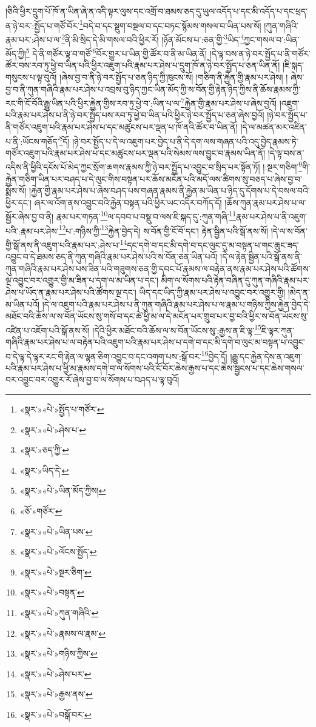 །ཅིའི་ཕྱིར་དྲུག་པོ་ཁོ་ན་ཡིན་ཞེ་ན་འདི་ལྟར་ལུས་དང་འགྲོ་བ་ཐམས་ཅད་དུ་ཡུལ་འདོད་པ་དང་མི་འདོད་པ་དང་ཕྲད་ན་ཉེ་བར་:སྤྱོད་པ་གཙོ་བོར་\footnote{«སྣར་»«པེ་»སྤྱོད་པ་གཙོར་}བདེ་བ་དང་སྡུག་བསྔལ་བ་དང་བཏང་སྙོམས་གསལ་བ་ཡིན་པས་སོ། །ཀུན་གཞིའི་རྣམ་པར་:ཤེས་པ་ལ་\footnote{«སྣར་»«པེ་»ཤེས་པ་}ནི་མི་སྲིད་དེ་མི་གསལ་བའི་ཕྱིར་རོ། །ཉོན་མོངས་པ་:ཅན་གྱི་\footnote{«སྣར་»ཅད་ཀྱི་}ཡིད་\footnote{«སྣར་»ཡིད་དེ་}ཀྱང་གསལ་བ་:ཡིན་མོད་ཀྱི།\footnote{«སྣར་»«པེ་»ཡིན་མོད་ཀྱིས།} དེ་ནི་གཙོར་ལྟ་བ་གཙོ་\footnote{«ཅོ་»གཙོར་}བོར་གྱུར་པ་ཡིན་གྱི་ཚོར་བ་ནི་མ་ཡིན་ནོ། །དེ་ལྟ་བས་ན་ཉེ་བར་སྤྱོད་པ་ནི་གཙོར་ཚོར་བས་རབ་ཏུ་ཕྱེ་བ་ཡིན་པའི་ཕྱིར་འཇུག་པའི་རྣམ་པར་ཤེས་པ་དྲུག་ཁོ་ན་ཉེ་བར་སྤྱོད་པ་ཅན་ཡིན་ནོ། །ཇི་སྐད་གསུངས་པ་ལྟ་བུའོ། །ཞེས་བྱ་བ་ནི་ཉེ་བར་སྤྱོད་པ་ཅན་ཉིད་ཀྱི་ཁུངས་སོ། །གཅིག་ནི་རྐྱེན་གྱི་རྣམ་པར་ཤེས། །
ཞེས་བྱ་བ་ནི་ཀུན་གཞིའི་རྣམ་པར་ཤེས་པ་འབྲས་བུ་ཉིད་ཀྱང་ཡིན་མོད་ཀྱི་ས་བོན་གྱི་རྟེན་ཉིད་ཀྱིས་ནི་ཆོས་རྣམས་ཀྱི་རང་གི་ངོ་བོའི་རྒྱུ་ཡིན་པའི་ཕྱིར་རྐྱེན་གྱིས་རབ་ཏུ་ཕྱེ་བ་:ཡིན་པ་ལ་\footnote{«སྣར་»«པེ་»ཡིན་པས་}རྐྱེན་གྱི་རྣམ་པར་ཤེས་པ་ཞེས་བྱའོ། །འཇུག་པའི་རྣམ་པར་ཤེས་པ་ནི་ཉེ་བར་སྤྱོད་པས་རབ་ཏུ་ཕྱེ་བ་ཡིན་པའི་ཕྱིར་ཉེ་བར་སྤྱོད་པ་ཅན་ཞེས་བྱའོ། །ཉེ་བར་སྤྱོད་པ་ནི་གཙོར་འཇུག་པའི་རྣམ་པར་ཤེས་པ་དང་མཚུངས་པར་ལྡན་པ་ཁོ་ནའི་ཚོར་བ་ཡིན་ནོ། །དེ་ལ་མཚན་མར་འཛིན་པ་ནི་:ཡོངས་གཅོད་\footnote{«སྣར་»«པེ་»ལོངས་སྤྱོད་}དོ། །ཉེ་བར་སྤྱོད་པ་དེ་ལ་འཇུག་པར་བྱེད་པ་ནི་དེ་དག་ལས་གཞན་པའི་འདུ་བྱེད་རྣམས་ཏེ་གཙོར་འཇུག་པའི་རྣམ་པར་ཤེས་པ་དང་མཚུངས་པར་ལྡན་པའི་སེམས་ལས་བྱུང་བ་རྣམས་ཡིན་ནོ། །དེ་ལྟ་བས་ན་འདིས་ནི་ཕྱིའི་དངོས་པོ་མེད་ཀྱང་སྲོག་ཆགས་རྣམས་ཀྱི་ཉེ་བར་སྤྱོད་པ་འབྱུང་བ་སྲིད་པར་སྟོན་ཏོ། །:སྔར་གཅིག་\footnote{«སྣར་»«པེ་»སྔར་ཅིག་}གི་རྐྱེན་གཅིག་ཡིན་པར་བཤད་པ་དེ་ལུང་གིས་བསྟན་པར་ཆོས་མངོན་པའི་མདོ་ལས་ཚིགས་སུ་བཅད་པ་ཞེས་བྱ་བ་སྨོས་སོ། །རྐྱེན་གྱི་རྣམ་པར་ཤེས་པ་ཞེས་བཤད་པས་གཞན་རྣམས་ནི་རྐྱེན་མ་ཡིན་པ་ཉིད་དུ་དོགས་པ་དེ་བསལ་བའི་ཕྱིར་དང་། ཞར་ལ་འོག་ནས་འབྱུང་བའི་རྐྱེན་བསྟན་པའི་ཕྱིར་ཡང་འདིར་བཀོད་དོ། །ཆོས་ཀུན་རྣམ་པར་ཤེས་པ་ལ་སྦྱོར་ཞེས་བྱ་བ་ནི། རྣམ་པར་གཏན་\footnote{«སྣར་»«པེ་»བསྟན་}ལ་དབབ་པ་བསྡུ་བ་ལས་ཇི་སྐད་དུ་:ཀུན་གཞི་\footnote{«སྣར་»«པེ་»ཀུན་གཞིའི་}རྣམ་པར་ཤེས་པ་ནི་འཇུག་པའི་:རྣམ་པར་ཤེས་\footnote{«སྣར་»«པེ་»རྣམས་ལ་རྣམ་}པ་:གཉིས་ཀྱི་\footnote{«སྣར་»«པེ་»གཉིས་ཀྱིས་}རྐྱེན་བྱེད་དེ། ས་བོན་གྱི་ངོ་བོ་དང་། རྟེན་སྦྱིན་པའི་སྒོ་ནས་སོ། །དེ་ལ་ས་བོན་གྱི་སྒོ་ནས་ནི་འཇུག་པའི་རྣམ་པར་:ཤེས་པ་\footnote{«སྣར་»«པེ་»ཤེས་པར་}དང་དགེ་བ་དང་མི་དགེ་བ་དང་ལུང་དུ་མ་བསྟན་པ་གང་ཆུང་ཟད་འབྱུང་བ་དེ་ཐམས་ཅད་ནི་ཀུན་གཞིའི་རྣམ་པར་ཤེས་པའི་ས་བོན་ཅན་ཡིན་པའོ། །དེ་ལ་རྟེན་སྦྱིན་པའི་སྒོ་ནས་ནི་ཀུན་གཞིའི་རྣམ་པར་ཤེས་པས་ཟིན་པའི་གཟུགས་ཅན་གྱི་དབང་པོ་རྣམས་ལ་བརྟེན་ནས་རྣམ་པར་ཤེས་པའི་ཚོགས་ལྔ་འབྱུང་བར་འགྱུར་གྱི་མ་ཟིན་པ་དག་ལ་མ་ཡིན་པ་དང་། མིག་ལ་སོགས་པའི་རྟེན་བཞིན་དུ་ཀུན་གཞིའི་རྣམ་པར་ཤེས་པ་ཡོད་ན་རྣམ་པར་ཤེས་པའི་ཚོགས་ལྔ་དང་། ཡིད་དང་ཡིད་ཀྱི་རྣམ་པར་ཤེས་པ་འབྱུང་བར་འགྱུར་གྱི། །མེད་ན་མ་ཡིན་པའོ། །དེ་ལ་འཇུག་པའི་རྣམ་པར་ཤེས་པ་ནི་ཀུན་གཞིའི་རྣམ་པར་ཤེས་པ་ལ་རྣམ་པ་གཉིས་ཀྱིས་རྐྱེན་བྱེད་དེ་མཐོང་བའི་ཆོས་ལ་ས་བོན་ཡོངས་སུ་གསོ་བ་དང་ཚེ་ཕྱི་མ་ལ་དེ་མངོན་པར་གྲུབ་པར་བྱ་བའི་ཕྱིར་ས་བོན་ཡོངས་སུ་འཛིན་པ་འཇོག་པའི་སྒོ་ནས་སོ། །དེའི་ཕྱིར་མཐོང་བའི་ཆོས་ལ་ས་བོན་ཡོངས་སུ་:རྒྱས་ན་ཇི་ལྟ་\footnote{«སྣར་»«པེ་»རྒྱས་ནས་}ཇི་ལྟར་ཀུན་གཞིའི་རྣམ་པར་ཤེས་པ་ལ་བརྟེན་པའི་འཇུག་པའི་རྣམ་པར་ཤེས་པ་དགེ་བ་དང་མི་དགེ་བ་ལུང་མ་བསྟན་པ་འབྱུང་བ་དེ་ལྟ་དེ་ལྟར་རང་གི་རྟེན་ལ་ལྷན་ཅིག་འབྱུང་བ་དང་འགག་པས་:སྒོ་བར་\footnote{«སྣར་»«པེ་»བསྒོ་བར་}བྱེད་དོ། །རྒྱུ་དང་རྐྱེན་དེས་ན་འཇུག་པའི་རྣམ་པར་ཤེས་པ་ཕྱི་མ་རྣམས་དགེ་བ་ལ་སོགས་པའི་ངོ་བོར་ཆེས་རྒྱས་པ་དང་ཆེས་སྦྱངས་པ་དང་ཆེས་གསལ་བར་འབྱུང་བར་འགྱུར་རོ་ཞེས་བྱ་བ་ལ་སོགས་པ་བཤད་པ་ལྟ་བུའོ། 
